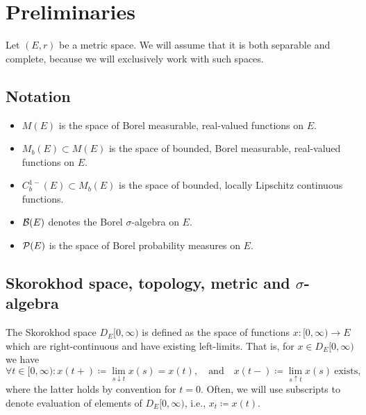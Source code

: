 \section{Preliminaries}

Let $(E,r)$ be a metric space.
We will assume that it is both separable and complete, because we will exclusively work with such spaces.


\subsection{Notation}
\begin{itemize}
    \item $M(E)$ is the space of Borel measurable, real-valued functions on $E$.
    \item $M_b(E) \subset M(E)$ is the space of bounded, Borel measurable, real-valued functions on $E$.
    \item $C_b^{1-}(E) \subset M_b(E)$ is the space of bounded, locally Lipschitz continuous functions.
    \item $\mathcal{B}(E)$ denotes the Borel $\sigma$-algebra on $E$.
    \item $\mathcal{P}(E)$ is the space of Borel probability measures on $E$.
\end{itemize}


\subsection{Skorokhod space, topology, metric and \texorpdfstring{$\sigma$}{sigma}-algebra}
The Skorokhod space $D_E[0,\infty)$ is defined as the space of functions $x : [0,\infty) \to E$ which are right-continuous and have existing left-limits.
That is, for $x \in D_E[0,\infty)$ we have 
\begin{equation}
    \forall t \in [0,\infty) : x(t+) \coloneqq \lim_{s \downarrow t} x(s) = x(t), \quad\text{and}\quad x(t-) \coloneqq \lim_{s \uparrow t} x(s)\ \text{exists},
\end{equation}
where the latter holds by convention for $t = 0$.
Often, we will use subscripts to denote evaluation of elements of $D_E[0,\infty)$, i.e., $x_t \coloneqq x(t)$.

